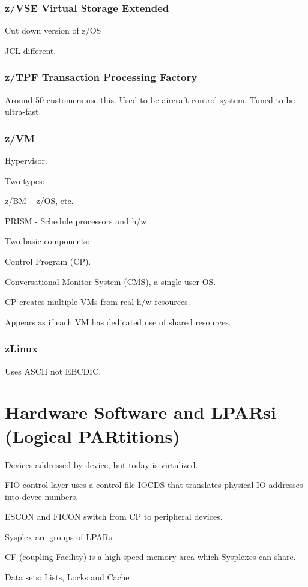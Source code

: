 \documentclass{report}
\begin{document}
\subsubsection{z/VSE Virtual Storage Extended}
Cut down version of z/OS

JCL different.

\subsubsection{z/TPF Transaction Processing Factory}
Around 50 customers use this. Used to be aircraft control system. Tuned to be ultra-fast.

\subsubsection{z/VM}
Hypervisor.

Two types:

z/BM -- z/OS, etc.

PRISM - Schedule processors and h/w

Two basic components:

Control Program (CP).

Conversational Monitor System (CMS), a single-user OS.

CP creates multiple VMs from real h/w resources.

Appears as if each VM has dedicated use of shared resources.

\subsubsection{zLinux}
Uses ASCII not EBCDIC.


\section{Hardware Software and LPARsi (Logical PARtitions)}

Devices addressed by device, but today is virtulized.

FIO control layer uses a control file IOCDS that translates physical IO addresses into devce numbers.

ESCON and FICON switch from CP to peripheral devices.

Sysplex are groups of LPARs.

CF (coupling Facility) is a high speed memory area which Sysplexes can share.

Data sets: Lists, Locks and Cache
\end{document}
